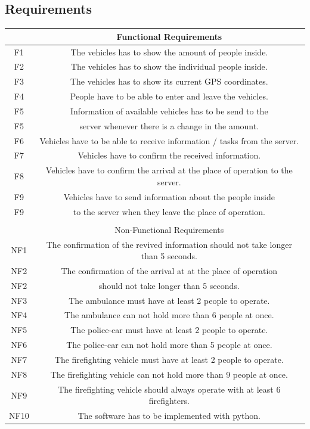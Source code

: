 \subsection{Requirements}
\begin{center}
\begin{tabular}{ c c }
  & Functional Requirements \\
   \hline\hline
 F1 & The vehicles has to show the amount of people inside. \\ 
 F2 & The vehicles has to show the individual people inside. \\  
 F3 & The vehicles has to show its current GPS coordinates. \\
 F4 & People have to be able to enter and leave the vehicles. \\
 F5 & Information of available vehicles has to be send to the \\
 F5 & server whenever there is a change in the amount. \\
 F6 & Vehicles have to be able to receive information / tasks from the server. \\
 F7 & Vehicles have to confirm the received information. \\
 F8 & Vehicles have to confirm the arrival at the place of operation to the server. \\
 F9 & Vehicles have to send information about the people inside \\
 F9 & to the server when they leave the place of operation.\\
 \\
  & Non-Functional Requirements \\
   \hline\hline
 NF1 & The confirmation of the revived information should not take longer than 5 seconds.\\
 NF2 & The confirmation of the arrival at at the place of operation \\
 NF2 & should not take longer than 5 seconds.\\
 NF3 & The ambulance must have at least 2 people to operate.\\
 NF4 & The ambulance can not hold more than 6 people at once.\\
 NF5 & The police-car must have at least 2 people to operate.\\
 NF6 & The police-car can not hold more than 5 people at once.\\
 NF7 & The firefighting vehicle must have at least 2 people to operate.\\
 NF8 & The firefighting vehicle can not hold more than 9 people at once.\\
 NF9 & The firefighting vehicle should always operate with at least 6 firefighters.\\
 NF10 & The software has to be implemented with python.
\end{tabular}
\end{center}
\newpage
